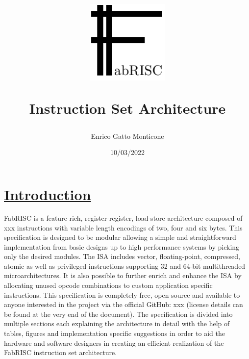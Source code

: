 \documentclass{article}
\title{\includegraphics[width=4cm]{./Images/LOGO.pdf} \par\noindent\huge{Instruction Set Architecture}}
\date{10/03/2022}
\author{Enrico Gatto Monticone}
\begin{document}
	\maketitle
	\newpage

	\tableofcontents
    \listoftables
	\newpage

    \section[Introduction]{\LARGE\underline{Introduction}} %

        FabRISC is a feature rich, register-register, load-store architecture composed of xxx instructions with variable length encodings of two, four and six bytes. This specification is designed to be modular allowing a simple and straightforward implementation from basic designs up to high performance systems by picking only the desired modules. The ISA includes vector, floating-point, compressed, atomic as well as privileged instructions supporting 32 and 64-bit multithreaded microarchitectures. It is also possible to further enrich and enhance the ISA by allocating unused opcode combinations to custom application specific instructions. This specification is completely free, open-source and available to anyone interested in the project via the official GitHub: xxx (license details can be found at the very end of the document). The specification is divided into multiple sections each explaining the architecture in detail with the help of tables, figures and implementation specific suggestions in order to aid the hardware and software designers in creating an efficient realization of the FabRISC instruction set architecture.
\end{document}
